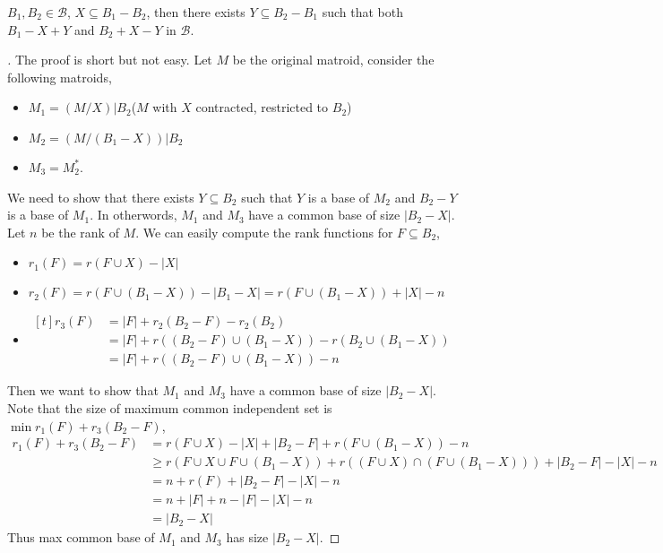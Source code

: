 \documentclass[12pt]{article}
\begin{document}
\begin{theorem}
    $B_1,B_2\in \mathcal B$, $X\subseteq B_1-B_2$, then there exists $Y\subseteq B_2-B_1$ such that both $B_1-X+Y$ and $B_2+X-Y$ in $\mathcal{B}$.
\end{theorem}
\begin{proof}[\cite{Woodall_1974}]
    The proof is short but not easy. Let $M$ be the original matroid, consider the following matroids,
    \begin{itemize}
        \item $M_1=(M/X)|B_2$($M$ with $X$ contracted, restricted to $B_2$)
        \item $M_2=(M/(B_1-X))|B_2$
        \item $M_3=M_2^*$.
    \end{itemize}
    We need to show that there exists $Y\subseteq B_2$ such that $Y$ is a base of $M_2$ and $B_2-Y$ is a base of $M_1$. In otherwords, $M_1$ and $M_3$ have a common base of size $|B_2-X|$.
    Let $n$ be the rank of $M$. We can easily compute the rank functions for $F\subseteq B_2$,
    \begin{itemize}
        \item $r_1(F)=r(F\cup X)-|X|$
        \item $r_2(F)=r(F\cup( B_1-X))-|B_1-X|=r(F\cup (B_1-X))+|X|-n$
        \item $\begin{aligned}[t]
                r_3(F)&=|F|+r_2(B_2-F)-r_2(B_2)\\
                    &= |F|+ r((B_2-F)\cup(B_1-X))-r(B_2\cup (B_1-X))\\
                    &=|F| + r((B_2-F)\cup(B_1-X))-n
            \end{aligned}$
    \end{itemize}
    Then we want to show that $M_1$ and $M_3$ have a common base of size $|B_2-X|$. Note that the size of maximum common independent set is $\min r_1(F)+r_3(B_2-F)$,
    \begin{align*}
        r_1(F)+r_3(B_2-F) &= r(F\cup X)-|X|+|B_2-F| + r(F\cup(B_1-X))-n\\
                        &\geq r(F\cup X\cup F\cup(B_1-X))+r((F\cup X)\cap (F\cup(B_1-X)))+|B_2-F|-|X|-n\\
                        &= n+r(F)+|B_2-F|-|X|-n\\
                        &=n+|F|+n-|F|-|X|-n\\
                        &=|B_2-X|
    \end{align*}
    Thus max common base of $M_1$ and $M_3$ has size $|B_2-X|$.
\end{proof}
\end{document}
